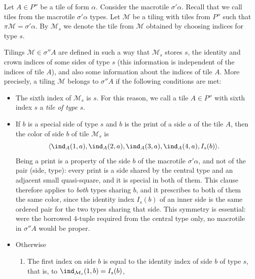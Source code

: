 \documentclass[12pt]{article}
\theoremstyle{remark}
\newcommand{\pair}[1]{\langle #1\rangle}
\begin{document}
Let $A\in P''$ be a tile of form $\alpha$. Consider the macrotile $\sigma'\alpha$.
Recall that we call tiles from the macrotile $\sigma'\alpha$ types.
Let $\mathcal M$ be a tiling with  tiles from $P''$ such that $\pi\mathcal M=\sigma'\alpha$. By $\mathcal M_s$
we denote the tile from $\mathcal M$ obtained by choosing indices
for type $s$. 

Tilings $\mathcal M\in \sigma'' A$ are defined in such a way that
$\mathcal M_s$ stores $s$, the identity and crown indices of some sides of type $s$
(this information is independent of the indices of tile $A$), and also
some information about the indices of tile $A$. More precisely, a tiling $\mathcal M$ belongs to $\sigma'' A$ if the following conditions are met:
\begin{itemize}
\item
The sixth index of $\mathcal M_s$ is $s$. For this reason, we call a tile $A\in P''$
with sixth index $s$ a \emph{tile of type $s$}.

\item If $b$ is a special side of type $s$ and $b$ is the print of a side $a$ of the tile $A$,
then the color of side $b$ of tile $\mathcal M_s$
is
$$\pair{\ind_A(1,a),\ind_A(2,a), \ind_A(3,a),\ind_A(4,a),I_s(b)}.$$
Being a print is a property of the side $b$ of the macrotile $\sigma'\alpha$, and not of the pair
(side, type): every print is a side shared by the central type and an adjacent small quasi-square,
and it is special in both of them. This clause therefore applies to \emph{both} types sharing $b$,
and it prescribes to both of them the same color, since the identity index $I_s(b)$ of an inner
side is the same ordered pair for the two types sharing that side. This symmetry is essential:
were the borrowed 4-tuple required from the central type only, no macrotile in $\sigma''A$
would be proper.


\item Otherwise
\begin{enumerate}
\item The first index on side $b$ is equal to the
identity index of side $b$ of type $s$, that is, to $\ind_{\mathcal M_s}(1,b)=I_s(b)$,


\end{enumerate}
\end{itemize}
\end{document}

